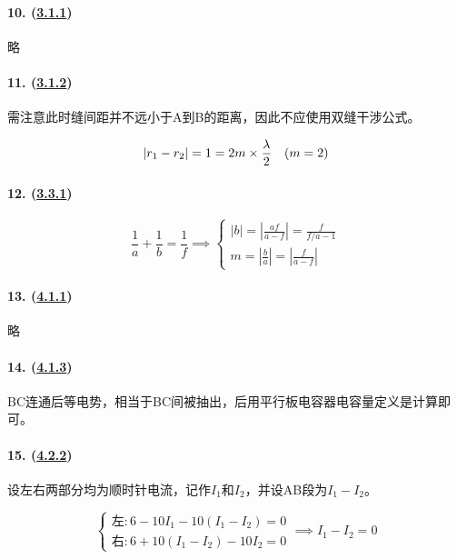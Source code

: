 \paragraph{10. (\hyperref[subsec:3.1.1]{3.1.1})} 略
\paragraph{11. (\hyperref[subsec:3.1.2]{3.1.2})} 需注意此时缝间距并不远小于A到B的距离，因此不应使用双缝干涉公式。

\begin{equation*}
    |r_1-r_2|=1=2m\times\frac\lambda2\quad(m=2)\\
\end{equation*}

\paragraph{12. (\hyperref[subsec:3.3.1]{3.3.1})}

\begin{equation*}
    \frac1a+\frac1b=\frac1f\implies
    \begin{cases}
        |b|=\left|\frac{af}{a-f}\right|=\frac{f}{f/a-1}\\
        m=\left|\frac{b}{a}\right|=\left|\frac{f}{a-f}\right|
    \end{cases}
\end{equation*}

\paragraph{13. (\hyperref[subsec:4.1.1]{4.1.1})} 略
\paragraph{14. (\hyperref[subsec:4.1.3]{4.1.3})} BC连通后等电势，相当于BC间被抽出，后用平行板电容器电容量定义是计算即可。

\paragraph{15. (\hyperref[subsec:4.2.2]{4.2.2})} 设左右两部分均为顺时针电流，记作$I_1$和$I_2$，并设AB段为$I_1-I_2$。

\begin{equation*}
    \begin{cases}
        \textrm{左}: 6-10I_1-10(I_1-I_2)=0\\
        \textrm{右}: 6+10(I_1-I_2)-10I_2=0
    \end{cases}\implies
    I_1-I_2=0
\end{equation*}

